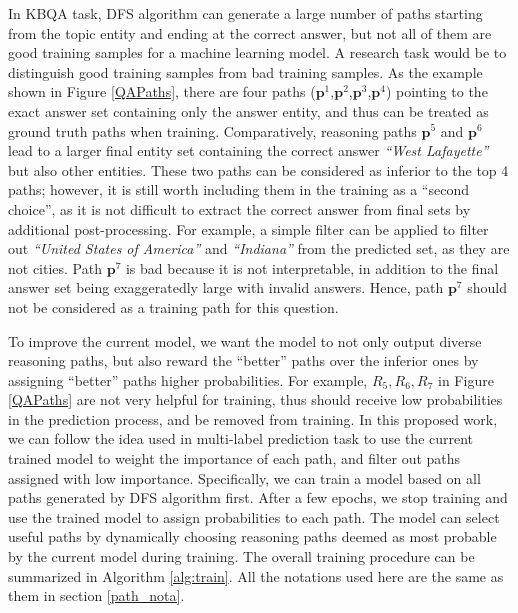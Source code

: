 In KBQA task, DFS algorithm can generate a large number of paths starting from the topic entity and ending at the correct answer, but not all of them are good training samples for a machine learning model. A research task would be to distinguish good training samples from bad training samples. As the example shown in Figure \ref{QAPaths}, there are four paths ($\mathbf{p}^1$,$\mathbf{p}^2$,$\mathbf{p}^3$,$\mathbf{p}^4$) pointing to the exact answer set containing only the answer entity, and thus can be treated as ground truth paths when training. Comparatively, reasoning paths $\mathbf{p}^5$ and $\mathbf{p}^6$ lead to a larger final entity set containing the correct answer \textit{``West Lafayette''} but also other entities. These two paths can be considered as inferior to the top 4 paths; however, it is still worth including them in the training as a ``second choice'', as it is not difficult to extract the correct answer from final sets by additional post-processing. For example, a simple filter can be applied to filter out \textit{``United States of America''} and \textit{``Indiana''} from the predicted set, as they are not cities. Path $\mathbf{p}^7$ is bad because it is not interpretable, in addition to the final answer set being exaggeratedly large with invalid answers. Hence, path $\mathbf{p}^7$ should not be considered as a training path for this question. %

To improve the current model, we want the model to not only output diverse reasoning paths, but also reward the ``better'' paths over the inferior ones by assigning ``better'' paths higher probabilities. For example, $R_5, R_6, R_7$ in Figure \ref{QAPaths} are not very helpful for training, thus should receive low probabilities in the prediction process, and be removed from training. In this proposed work, we can follow the idea used in multi-label prediction task to use the current trained model to weight the importance of each path, and filter out paths assigned with low importance. Specifically, we can train a model based on all paths generated by DFS algorithm first. After a few epochs, we stop training and use the trained model to assign probabilities to each path. The model can select useful paths by dynamically choosing reasoning paths deemed as most probable by the current model during training. The overall training procedure can be summarized in Algorithm \ref{alg:train}. All the notations used here are the same as them in section \ref{path_nota}. 


